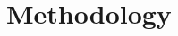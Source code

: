 \documentclass{elsarticle}
\numberwithin{equation}{section}
\begin{document}
\section{Methodology}
\end{document}
